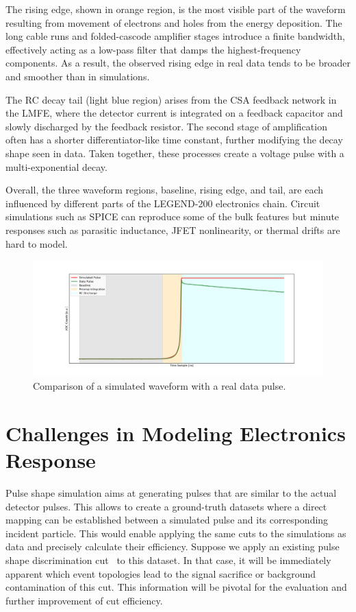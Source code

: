 The rising edge, shown in orange region, is the most visible part of the waveform resulting from movement of electrons and holes from the energy deposition. The long cable runs and folded-cascode amplifier stages introduce a finite bandwidth, effectively acting as a low-pass filter that damps the highest-frequency components. As a result, the observed rising edge in real data tends to be broader and smoother than in simulations. 

The RC decay tail (light blue region) arises from the CSA feedback network in the LMFE, where the detector current is integrated on a feedback capacitor and slowly discharged by the feedback resistor. The second stage of amplification often has a shorter differentiator-like time constant, further modifying the decay shape seen in data. Taken together, these processes create a voltage pulse with a multi-exponential decay. 

Overall, the three waveform regions, baseline, rising edge, and tail, are each influenced by different parts of the LEGEND-200 electronics chain. Circuit simulations such as SPICE can reproduce some of the bulk features but minute responses such as parasitic inductance, JFET nonlinearity, or thermal drifts are hard to model.

\begin{figure}[!htb]%
    \includegraphics[width=\linewidth,trim={4cm 0pc 3.5cm 0pc},clip]{ch5/figs/wf_comp_sim_data.png}
    \caption{Comparison of a simulated waveform with a real data pulse.}
    \label{fig:sim_data_comp}
\end{figure}

\section{Challenges in Modeling Electronics Response}


Pulse shape simulation aims at generating pulses that are similar to the actual detector pulses. This allows to create a ground-truth datasets where a direct mapping can be established between a simulated pulse and its corresponding incident particle. This would enable applying the same cuts to the simulations as data and precisely calculate their efficiency. Suppose we apply an existing pulse shape discrimination cut~\cite{AvsE} to this dataset. In that case, it will be immediately apparent which event topologies lead to the signal sacrifice or background contamination of this cut. This information will be pivotal for the evaluation and further improvement of cut efficiency. 

